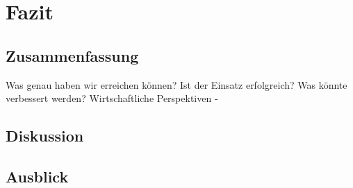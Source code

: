 \chapter{Fazit}

\section{Zusammenfassung}
Was genau haben wir erreichen können? Ist der Einsatz erfolgreich? Was könnte verbessert werden? Wirtschaftliche Perspektiven - 

\section{Diskussion}

\section{Ausblick}
